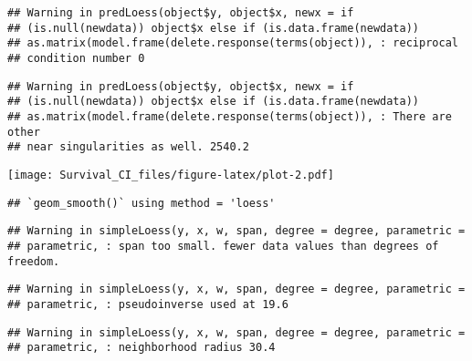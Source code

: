 \documentclass[]{article}
\newenvironment{Shaded}{\begin{snugshade}}{\end{snugshade}}
\newcommand{\KeywordTok}[1]{\textcolor[rgb]{0.13,0.29,0.53}{\textbf{{#1}}}}
\newcommand{\DataTypeTok}[1]{\textcolor[rgb]{0.13,0.29,0.53}{{#1}}}
\newcommand{\StringTok}[1]{\textcolor[rgb]{0.31,0.60,0.02}{{#1}}}
\newcommand{\CommentTok}[1]{\textcolor[rgb]{0.56,0.35,0.01}{\textit{{#1}}}}
\newcommand{\NormalTok}[1]{{#1}}
\begin{document}
\begin{verbatim}
## Warning in predLoess(object$y, object$x, newx = if
## (is.null(newdata)) object$x else if (is.data.frame(newdata))
## as.matrix(model.frame(delete.response(terms(object)), : reciprocal
## condition number 0
\end{verbatim}

\begin{verbatim}
## Warning in predLoess(object$y, object$x, newx = if
## (is.null(newdata)) object$x else if (is.data.frame(newdata))
## as.matrix(model.frame(delete.response(terms(object)), : There are other
## near singularities as well. 2540.2
\end{verbatim}

\texttt{[image: Survival\_CI\_files/figure-latex/plot-2.pdf]}

\begin{Shaded}
\end{Shaded}

\begin{verbatim}
## `geom_smooth()` using method = 'loess'
\end{verbatim}

\begin{verbatim}
## Warning in simpleLoess(y, x, w, span, degree = degree, parametric =
## parametric, : span too small. fewer data values than degrees of freedom.
\end{verbatim}

\begin{verbatim}
## Warning in simpleLoess(y, x, w, span, degree = degree, parametric =
## parametric, : pseudoinverse used at 19.6
\end{verbatim}

\begin{verbatim}
## Warning in simpleLoess(y, x, w, span, degree = degree, parametric =
## parametric, : neighborhood radius 30.4
\end{verbatim}
\end{document}
